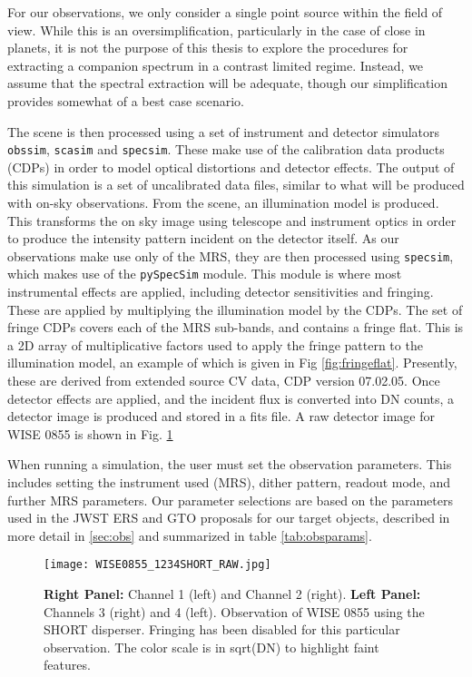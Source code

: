 For our observations, we only consider a single point source within the field of view.
While this is an oversimplification, particularly in the case of close in planets, it is not the purpose of this thesis to explore the procedures for extracting a companion spectrum in a contrast limited regime.
Instead, we assume that the spectral extraction will be adequate, though our simplification provides somewhat of a best case scenario.

The scene is then processed using a set of instrument and detector simulators \verb|obssim|, \verb|scasim| and \verb|specsim|.
These make use of the calibration data products (CDPs) in order to model optical distortions and detector effects.
The output of this simulation is a set of uncalibrated data files, similar to what will be produced with on-sky observations.
From the scene, an illumination model is produced. This transforms the on sky image using telescope and instrument optics in order to produce the intensity pattern incident on the detector itself.
As our observations make use only of the MRS, they are then processed using \verb|specsim|, which makes use of the \verb|pySpecSim| module.
This module is where most instrumental effects are applied, including detector sensitivities and fringing.
These are applied by multiplying the illumination model by the CDPs. 
The set of fringe CDPs covers each of the MRS sub-bands, and contains a fringe flat.
This is a 2D array of multiplicative factors used to apply the fringe pattern to the illumination model, an example of which is given in Fig \ref{fig:fringeflat}. 
Presently, these are derived from extended source CV data, CDP version 07.02.05.
Once detector effects are applied, and the incident flux is converted into DN counts, a detector image is produced and stored in a fits file.
A raw detector image for WISE 0855 is shown in Fig. \ref{fig:0855raw}

When running a simulation, the user must set the observation parameters.
This includes setting the instrument used (MRS), dither pattern, readout mode, and further MRS parameters.
Our parameter selections  are based on the parameters used in the JWST ERS and GTO proposals for our target objects, described in more detail in \ref{sec:obs} and summarized in table \ref{tab:obsparams}.
\begin{figure}[t]
	\texttt{[image: WISE0855\_1234SHORT\_RAW.jpg]}
	\caption{\textbf{Right Panel:} Channel 1 (left) and Channel 2 (right). \textbf{Left Panel:} Channels 3 (right) and 4 (left). Observation of WISE 0855 using the SHORT disperser. Fringing has been disabled for this particular observation. The color scale is in sqrt(DN) to highlight faint features.}
	\label{fig:0855raw}
\end{figure}

